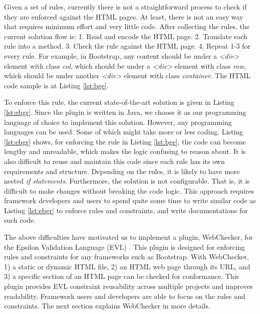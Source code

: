 \documentclass[conference]{IEEETran}
\begin{document}
Given a set of rules, currently there is not a straightforward process to check if they are enforced against the HTML pages. At least, there is not an easy way that requires minimum effort and very little code. After collecting the rules, the current solution flow is:
1. Read and encode the HTML page. 
2. Translate each rule into a method. 
3. Check the rule against the HTML page.
4. Repeat 1-3 for every rule.
For example, in Bootstrap, any content should be under a \textit{<div>} element with class \textit{col}, which should be under a \textit{<div>} element with class \textit{row}, which should be under another \textit{<div>} element with class \textit{container}. The HTML code sample is at Listing \ref{lst:bge}.  



To enforce this rule, the current state-of-the-art solution is given in Listing \ref{lst:ebgr}. Since the plugin is written in Java, we choose it as our programming language of choice to implement this solution. However, any programming languages can be used. Some of which might take more or less coding. Listing \ref{lst:ebgr} shows, for enforcing the rule in Listing \ref{lst:bge}, the code can become lengthy and unreadable, which makes the logic confusing to reason about. It is also difficult to reuse and maintain this code since each rule has its own requirements and structure. Depending on the rules, it is likely to have more nested \textit{if statements}. Furthermore, the solution is not configurable. That is, it is difficult to make changes without breaking the code logic. This approach requires framework developers and users to spend quite some time to write similar code as Listing \ref{lst:ebgr} to enforce rules and constraints, and write documentations for such code.   

The above difficulties have motivated us to implement a plugin, WebChecker, for the Epsilon Validation Language (EVL) \cite{Kolovos2009}.  This plugin is designed for enforcing rules and constraints for any frameworks such as Bootstrap. With WebChecker, 1) a static or dynamic HTML file, 2) an HTML web page through its URL, and 3) a specific section of an HTML page can be checked for conformance. This plugin provides EVL constraint reusability across multiple projects and improves readability. Framework users and developers are able to focus on the rules and constraints. The next section explains WebChecker in more details.    
\end{document}
